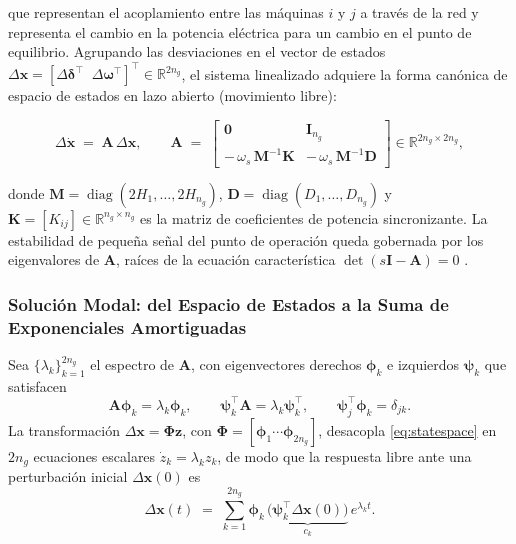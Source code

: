 que representan el acoplamiento entre las
máquinas $i$ y $j$ a través de la red y representa el cambio en la potencia eléctrica 
para un cambio en el punto de equilibrio. Agrupando las desviaciones en el
vector de estados $\Delta\mathbf{x} =
[\Delta\boldsymbol{\delta}^\top \;\; \Delta\boldsymbol{\omega}^\top]^\top
\in \mathbb{R}^{2n_g}$, el sistema linealizado adquiere la forma canónica
de espacio de estados en lazo abierto (movimiento libre):

\begin{equation}
    \Delta\dot{\mathbf{x}} \;=\; \mathbf{A}\,\Delta\mathbf{x},
    \qquad
    \mathbf{A} \;=\;
    \begin{bmatrix}
        \mathbf{0} & \mathbf{I}_{n_g} \\[4pt]
        -\,\omega_s\,\mathbf{M}^{-1}\mathbf{K} & -\,\omega_s\,\mathbf{M}^{-1}\mathbf{D}
    \end{bmatrix}
    \in \mathbb{R}^{2n_g \times 2n_g},
    \label{eq:statespace}
\end{equation}

donde $\mathbf{M} = \operatorname{diag}(2H_1,\ldots,2H_{n_g})$,
$\mathbf{D} = \operatorname{diag}(D_1,\ldots,D_{n_g})$ y
$\mathbf{K} = [K_{ij}] \in \mathbb{R}^{n_g\times n_g}$ es la matriz de
coeficientes de potencia sincronizante. La estabilidad de pequeña señal del
punto de operación queda gobernada por los eigenvalores de $\mathbf{A}$,
raíces de la ecuación característica
$\det(s\mathbf{I}-\mathbf{A}) = 0$ \cite{kundur1994}.


\subsubsection{Solución Modal: del Espacio de Estados a la Suma de
Exponenciales Amortiguadas}

Sea $\{\lambda_k\}_{k=1}^{2n_g}$ el espectro de $\mathbf{A}$, con
eigenvectores derechos $\boldsymbol{\phi}_k$ e izquierdos
$\boldsymbol{\psi}_k$ que satisfacen
\begin{equation}
    \mathbf{A}\boldsymbol{\phi}_k = \lambda_k \boldsymbol{\phi}_k,
    \qquad
    \boldsymbol{\psi}_k^\top \mathbf{A} = \lambda_k \boldsymbol{\psi}_k^\top,
    \qquad
    \boldsymbol{\psi}_j^\top\boldsymbol{\phi}_k = \delta_{jk}.
    \label{eq:eigen}
\end{equation}
La transformación $\Delta\mathbf{x} = \boldsymbol{\Phi}\mathbf{z}$,
con $\boldsymbol{\Phi}=[\boldsymbol{\phi}_1 \cdots \boldsymbol{\phi}_{2n_g}]$,
desacopla \eqref{eq:statespace} en $2n_g$ ecuaciones escalares
$\dot{z}_k = \lambda_k z_k$, de modo que la respuesta libre ante una
perturbación inicial $\Delta\mathbf{x}(0)$ es \cite{kundur1994}
\begin{equation}
    \Delta\mathbf{x}(t)
    \;=\;
    \sum_{k=1}^{2n_g} \boldsymbol{\phi}_k\,
    \underbrace{\bigl(\boldsymbol{\psi}_k^\top \Delta\mathbf{x}(0)\bigr)}_{c_k}\,
    e^{\lambda_k t}.
    \label{eq:modal_response}
\end{equation}

